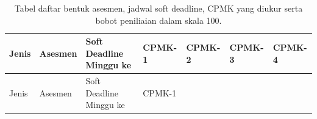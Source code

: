 \documentclass[
  letterpaper,
  DIV=11,
  numbers=noendperiod]{scrreprt}
\begin{document}
\begin{longtable}[]{@{}
  >{\raggedright\arraybackslash}p{}
  >{\raggedright\arraybackslash}p{}
  >{\raggedright\arraybackslash}p{}
  >{\raggedright\arraybackslash}p{}
  >{\raggedright\arraybackslash}p{}
  >{\raggedright\arraybackslash}p{}
  >{\raggedright\arraybackslash}p{}@{}}
\caption{Tabel daftar bentuk asesmen, jadwal soft deadline, CPMK yang
diukur serta bobot peniliaian dalam skala
100.}\label{tbl-asesmen}\tabularnewline
\toprule\noalign{}
\begin{minipage}[b]{\linewidth}\raggedright
Jenis
\end{minipage} & \begin{minipage}[b]{\linewidth}\raggedright
Asesmen
\end{minipage} & \begin{minipage}[b]{\linewidth}\raggedright
Soft Deadline Minggu ke
\end{minipage} & \begin{minipage}[b]{\linewidth}\raggedright
CPMK-1
\end{minipage} & \begin{minipage}[b]{\linewidth}\raggedright
CPMK-2
\end{minipage} & \begin{minipage}[b]{\linewidth}\raggedright
CPMK-3
\end{minipage} & \begin{minipage}[b]{\linewidth}\raggedright
CPMK-4
\end{minipage} \\
\midrule\noalign{}
\endfirsthead
\toprule\noalign{}
\begin{minipage}[b]{\linewidth}\raggedright
Jenis
\end{minipage} & \begin{minipage}[b]{\linewidth}\raggedright
Asesmen
\end{minipage} & \begin{minipage}[b]{\linewidth}\raggedright
Soft Deadline Minggu ke
\end{minipage} & \begin{minipage}[b]{\linewidth}\raggedright
CPMK-1
\end{minipage} & \begin{minipage}[b]{\linewidth}\raggedright

\end{minipage}
\end{longtable}
\end{document}

